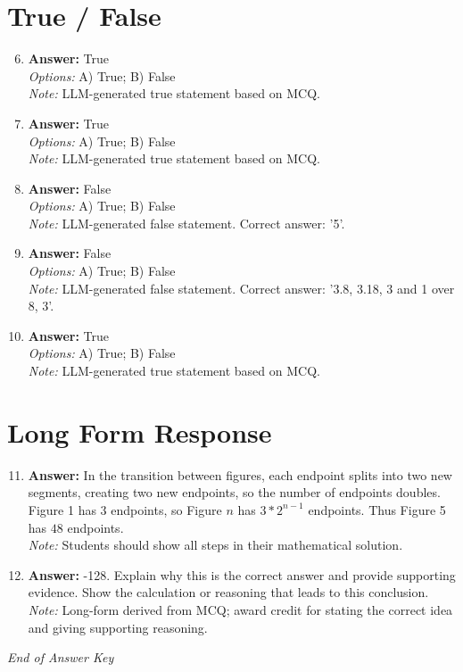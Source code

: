 \documentclass[12pt]{article}
\begin{document}
\section*{True / False}
\begin{enumerate}[label=\arabic*.]
\setcounter{enumi}{5}
\item \textbf{Answer:} True
\\ \textit{Options:} A) True; B) False
\\ \textit{Note:} LLM-generated true statement based on MCQ.
\item \textbf{Answer:} True
\\ \textit{Options:} A) True; B) False
\\ \textit{Note:} LLM-generated true statement based on MCQ.
\item \textbf{Answer:} False
\\ \textit{Options:} A) True; B) False
\\ \textit{Note:} LLM-generated false statement. Correct answer: '5'.
\item \textbf{Answer:} False
\\ \textit{Options:} A) True; B) False
\\ \textit{Note:} LLM-generated false statement. Correct answer: '3.8, 3.18, 3 and 1 over 8, 3'.
\item \textbf{Answer:} True
\\ \textit{Options:} A) True; B) False
\\ \textit{Note:} LLM-generated true statement based on MCQ.
\end{enumerate}

\section*{Long Form Response}
\begin{enumerate}[label=\arabic*.]
\setcounter{enumi}{10}
\item \textbf{Answer:} In the transition between figures, each endpoint splits into two new segments, creating two new endpoints, so the number of endpoints doubles. Figure 1 has $3$ endpoints, so Figure $n$ has $3*2^{n-1}$ endpoints. Thus Figure 5 has $\boxed{48}$ endpoints.
\\ \textit{Note:} Students should show all steps in their mathematical solution.
\item \textbf{Answer:} -128. Explain why this is the correct answer and provide supporting evidence. Show the calculation or reasoning that leads to this conclusion.
\\ \textit{Note:} Long-form derived from MCQ; award credit for stating the correct idea and giving supporting reasoning.
\end{enumerate}

\vfill
\noindent\textit{End of Answer Key}
\end{document}
